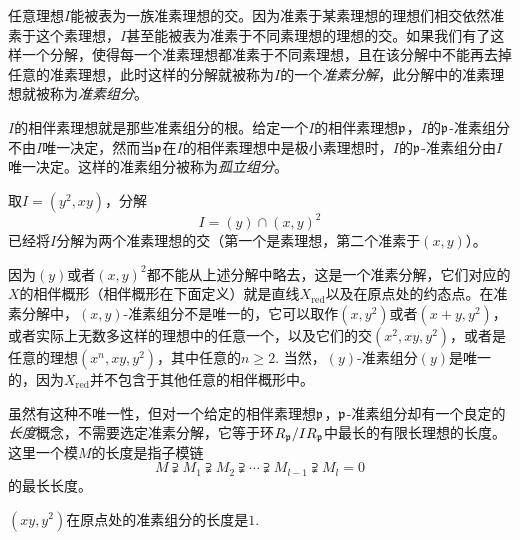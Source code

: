 任意理想$I$能被表为一族准素理想的交。因为准素于某素理想的理想们相交依然准素于这个素理想，$I$甚至能被表为准素于不同素理想的理想的交。如果我们有了这样一个分解，使得每一个准素理想都准素于不同素理想，且在该分解中不能再去掉任意的准素理想，此时这样的分解就被称为$I$的一个\textit{准素分解}，此分解中的准素理想就被称为\textit{准素组分}。

$I$的相伴素理想就是那些准素组分的根。给定一个$I$的相伴素理想$\mathfrak{p}$，$I$的$\mathfrak{p}$-准素组分不由$I$唯一决定，然而当$\mathfrak{p}$在$I$的相伴素理想中是极小素理想时，$I$的$\mathfrak{p}$-准素组分由$I$唯一决定。这样的准素组分被称为\textit{孤立组分}。

\begin{exe}
	取$I=(y^2,xy)$，分解
	\[
	I=(y)\cap (x,y)^2
	\]
	已经将$I$分解为两个准素理想的交（第一个是素理想，第二个准素于$(x,y)$）。
\end{exe}

因为$(y)$或者$(x,y)^2$都不能从上述分解中略去，这是一个准素分解，它们对应的$X$的相伴概形（相伴概形在下面定义）就是直线$X_{\mathrm{red}}$以及在原点处的约态点。在准素分解中，$(x,y)$\hyp 准素组分不是唯一的，它可以取作$(x,y^2)$或者$(x+y,y^2)$，或者实际上无数多这样的理想中的任意一个，以及它们的交$(x^2,xy,y^2)$，或者是任意的理想$(x^n,xy,y^2)$，其中任意的$n\geq 2$. 当然，$(y)$\hyp 准素组分$(y)$是唯一的，因为$X_{\mathrm{red}}$并不包含于其他任意的相伴概形中。

虽然有这种不唯一性，但对一个给定的相伴素理想$\mathfrak{p}$，$\mathfrak{p}$-准素组分却有一个良定的\textit{长度}概念，不需要选定准素分解，它等于环$R_{\mathfrak{p}}/IR_{\mathfrak{p}}$中最长的有限长理想的长度。这里一个模$M$的长度是指子模链
\[
	M\supsetneqq M_1 \supsetneqq M_2 \supsetneqq \cdots \supsetneqq M_{l-1} \supsetneqq M_l=0
\]
的最长长度。

\begin{exe}
	$(xy,y^2)$在原点处的准素组分的长度是$1$.
\end{exe}

